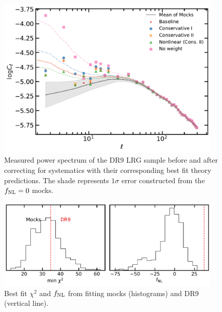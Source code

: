 \begin{figure}
    \centering
    \includegraphics[width=0.95\textwidth]{figures/model_dr9.pdf} 
    \caption{Measured power spectrum of the DR9 LRG sample before and after correcting for systematics with their corresponding best fit theory predictions. The shade represents $1\sigma$ error constructed from the $f_{\rm NL}=0$ mocks.}
    \label{fig:cl_dr9}
\end{figure}

\begin{figure}
\centering
    \includegraphics[width=0.95\textwidth]{figures/pdf_dr9vsmocks.pdf} 
    \caption{Best fit $\chi^{2}$ and $f_{\rm NL}$ from fitting mocks (histograms) and DR9 (vertical line).}\label{fig:dr9vsmocks}
\end{figure}

